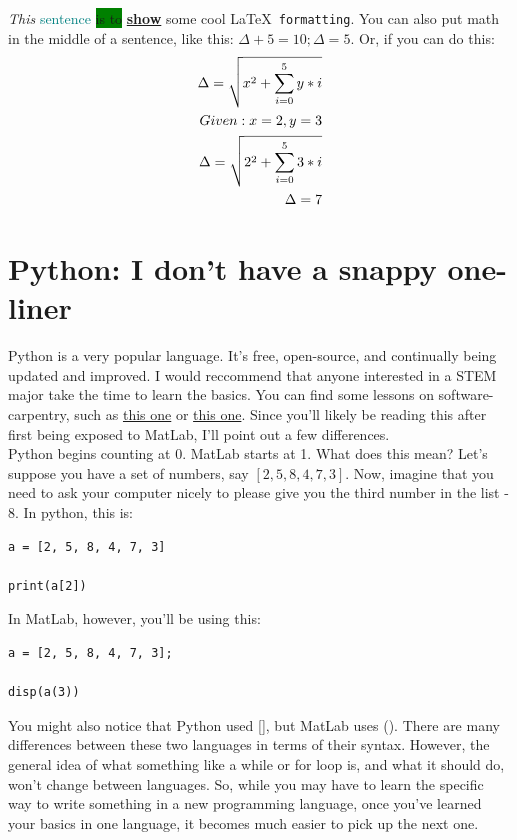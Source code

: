 \documentclass[letterpaper]{article}
\begin{document}
\emph{This} \textcolor{teal}{sentence} \colorbox{green}{is to} \underline{\textbf{show}} {\LARGE{some}} {\tiny{cool}} \LaTeX \texttt{ formatting}.  You can also put math in the middle of a sentence, like this: $ \Delta + 5 = 10 ; \Delta = 5$.  Or, if you can do this:
\begin{align}
\Delta = \sqrt{x^{2} + \sum_{i = 0}^{5}y*i} \label{eq:eq1} \\
Given: x = 2, y = 3 \nonumber \\
\Delta = \sqrt{2^{2} + \sum_{i = 0}^{5}3*i} \label{eq:eq1.1} \\
\Delta = 7 \notag
\end{align}

\section{Python: I don't have a snappy one-liner}

Python is a very popular language.  It's free, open-source, and continually being updated and improved.  I would reccommend that anyone interested in a STEM major take the time to learn the basics.  You can find some lessons on software-carpentry, such as \href{http://swcarpentry.github.io/python-novice-inflammation/}{this one} or \href{http://swcarpentry.github.io/python-novice-gapminder/}{this one}.  Since you'll likely be reading this after first being exposed to MatLab, I'll point out a few differences.\\

Python begins counting at 0.  MatLab starts at 1.  What does this mean?  Let's suppose you have a set of numbers, say $[2, 5, 8, 4, 7, 3]$.  Now, imagine that you need to ask your computer nicely to please give you the third number in the list - 8.  In python, this is:
\begin{verbatim}
a = [2, 5, 8, 4, 7, 3]

print(a[2])
\end{verbatim}
In MatLab, however, you'll be using this:
\begin{verbatim}
a = [2, 5, 8, 4, 7, 3];

disp(a(3))
\end{verbatim}
You might also notice that Python used [], but MatLab uses ().  There are many differences between these two languages in terms of their syntax.  However, the general idea of what something like a while or for loop is, and what it should do, won't change between languages.  So, while you may have to learn the specific way to write something in a new programming language, once you've learned your basics in one language, it becomes much easier to pick up the next one.
\end{document}
